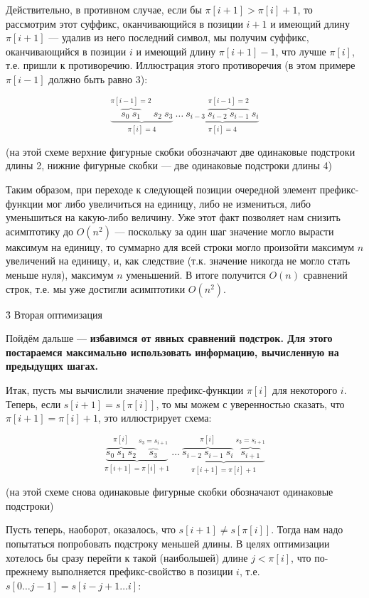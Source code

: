 Действительно, в противном случае, если бы $\pi[i+1] > \pi[i] + 1$, то рассмотрим этот суффикс, оканчивающийся в позиции $i+1$ и имеющий длину $\pi[i+1]$ --- удалив из него последний символ, мы получим суффикс, оканчивающийся в позиции $i$ и имеющий длину $\pi[i+1]-1$, что лучше $\pi[i]$, т.е. пришли к противоречию. Иллюстрация этого противоречия (в этом примере $\pi[i-1]$ должно быть равно 3):

$$ \underbrace{ \overbrace{s_0 \ s_1}^{\pi[i-1]=2} \ s_2 \ s_3}_{\pi[i]=4} \ \ldots\ \underbrace{ s_{i-3}\ \overbrace{s_{i-2}\ s_{i-1}}^{\pi[i-1]=2} \ s_i}_{\pi[i]=4} $$

(на этой схеме верхние фигурные скобки обозначают две одинаковые подстроки длины 2, нижние фигурные скобки --- две одинаковые подстроки длины 4)

Таким образом, при переходе к следующей позиции очередной элемент префикс-функции мог либо увеличиться на единицу, либо не измениться, либо уменьшиться на какую-либо величину. Уже этот факт позволяет нам снизить асимптотику до $O(n^2)$ --- поскольку за один шаг значение могло вырасти максимум на единицу, то суммарно для всей строки могло произойти максимум $n$ увеличений на единицу, и, как следствие (т.к. значение никогда не могло стать меньше нуля), максимум $n$ уменьшений. В итоге получится $O(n)$ сравнений строк, т.е. мы уже достигли асимптотики $O(n^2)$.

\h3{ Вторая оптимизация }

Пойдём дальше --- \bf{избавимся от явных сравнений подстрок}. Для этого постараемся максимально использовать информацию, вычисленную на предыдущих шагах.

Итак, пусть мы вычислили значение префикс-функции $\pi[i]$ для некоторого $i$. Теперь, если $s[i+1] = s[\pi[i]]$, то мы можем с уверенностью сказать, что $\pi[i+1] = \pi[i] + 1$, это иллюстрирует схема:

$$ \underbrace{ \overbrace{s_0 \ s_1 \ s_2}^{\pi[i]} \ \overbrace{s_3}^{s_3=s_{i+1}}}_{\pi[i+1]=\pi[i]+1} \ \ldots\ \underbrace{ \overbrace{s_{i-2}\ s_{i-1}\ s_i}^{\pi[i]} \ \overbrace{s_{i+1}}^{s_3=s_{i+1}}}_{\pi[i+1]=\pi[i]+1} $$

(на этой схеме снова одинаковые фигурные скобки обозначают одинаковые подстроки)

Пусть теперь, наоборот, оказалось, что $s[i+1] \ne s[\pi[i]]$. Тогда нам надо попытаться попробовать подстроку меньшей длины. В целях оптимизации хотелось бы сразу перейти к такой (наибольшей) длине $j < \pi[i]$, что по-прежнему выполняется префикс-свойство в позиции $i$, т.е. $s[0 \ldots j-1] = s[i-j+1 \ldots i]$:

